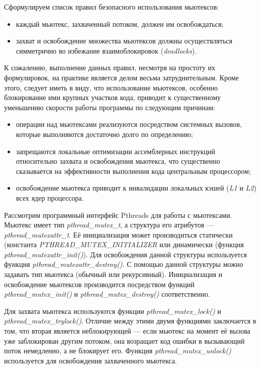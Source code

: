 Сформулируем список правил безопасного использования мьютексов:
\begin{itemize}
\item каждый мьютекс, захваченный потоком, должен им освобождаться;
\item захват и освобождение множества мьютексов должны осуществляться симметрично
  во избежание взаимоблокировок (\textit{deadlocks}).
\end{itemize}

К сожалению, выполнение данных правил, несмотря на простоту их формулировок,
на практике является делом весьма затруднительным.
Кроме этого, следует иметь в виду, что использование мьютексов,
особенно блокирование ими крупных участков кода, приводит к существенному
уменьшению скорости работы программы по следующим причинам:
\begin{itemize}
\item операции над мьютексами реализуются посредством системных вызовов,
  которые выполняются достаточно долго по определению;
\item запрещаются локальные оптимизации ассемблерных инструкций
  относительно захвата и освобождения мьютекса,
  что существенно сказывается на эффективности выполнения кода
  центральным процессором;
\item освобождение мьютекса приводит к инвалидации локальных кэшей
  (\textit{L1} и \textit{L2}) всех ядер процессора.
\end{itemize}

Рассмотрим программный интерфейс Pthreads для работы с мьютексами.
Мьютекс имеет тип \textit{pthread\_mutex\_t}, а структура его атрибутов ---
\textit{pthread\_mutexattr\_t}.
Её инициализация может производиться статически
(константа \textit{PTHREAD\_MUTEX\_INITIALIZER} или динамически
(функция \textit{pthread\_mutexattr\_init()}).
Для освобождения данной структуры используется функция
\textit{pthread\_mutexattr\_destroy()}.
С помощью данной структуры можно задавать тип мьютекса (обычный или рекурсивный).
Инициализация и освобождение мьютексов производится посредством
функций \textit{pthread\_mutex\_init()} и \textit{pthread\_mutex\_destroy()}
соответственно.

Для захвата мьютекса используются функции \textit{pthread\_mutex\_lock()}
и \textit{pthread\_mutex\_trylock()}. Отличие между этими двумя функциями
заключается в том, что вторая является неблокирующей --- если мьютекс на момент
её вызова уже заблокирован другим потоком, она возращает код ошибки в
вызывающий поток немедленно, а не блокирует его.
Функция \textit{pthread\_mutex\_unlock()} используется для освобождения
захваченного мьютекса.

